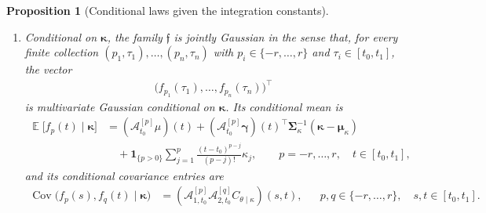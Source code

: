 \documentclass[11pt,a4paper]{article}
\newtheorem{proposition}{Proposition}
\theoremstyle{definition}
\theoremstyle{remark}
\DeclareMathOperator{\E}{\mathbb{E}}
\DeclareMathOperator{\Cov}{Cov}
\begin{document}
\begin{proposition}[Conditional laws given the integration constants]
\begin{enumerate}
\item Conditional on \(\boldsymbol{\kappa}\), the family \(\mathfrak{f}\) is jointly Gaussian in the sense that, for every finite collection \((p_1,\tau_1),\ldots,(p_n,\tau_n)\) with \(p_i\in\{-r,\ldots,r\}\) and \(\tau_i\in[t_0,t_1]\), the vector
\begin{align*}
\bigl(f_{p_1}(\tau_1),\ldots,f_{p_n}(\tau_n)\bigr)^\top
\end{align*}
is multivariate Gaussian conditional on \(\boldsymbol{\kappa}\). Its conditional mean is
\begin{align*}
\E\bigl[f_p(t)\mid \boldsymbol{\kappa}\bigr]
&=(\mathcal A_{t_0}^{[p]}\mu)(t)+(\mathcal A_{t_0}^{[p]}\boldsymbol{\gamma})(t)^\top\boldsymbol{\Sigma}_{\kappa}^{-1}(\boldsymbol{\kappa}-\boldsymbol{\mu}_{\kappa})\\
&\quad+\mathbf{1}_{\{p>0\}}\sum_{j=1}^{p}\frac{(t-t_0)^{p-j}}{(p-j)!}\kappa_j,
\qquad p=-r,\ldots,r,\quad t\in[t_0,t_1],
\end{align*}
and its conditional covariance entries are
\begin{align*}
\Cov\bigl(f_p(s),f_q(t)\mid \boldsymbol{\kappa}\bigr)
&=(\mathcal A_{1,t_0}^{[p]}\mathcal A_{2,t_0}^{[q]}C_{\theta\mid\kappa})(s,t), && p,q\in\{-r,\ldots,r\},\quad s,t\in[t_0,t_1].
\end{align*}
\end{enumerate}
\end{proposition}
\end{document}
